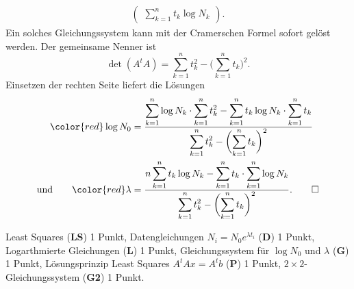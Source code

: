 \begin{loesung}
\begin{align*}
\begin{pmatrix}
\displaystyle \sum_{k=1}^n t_k \log N_k
\end{pmatrix}.
\end{align*}
Ein solches Gleichungssystem kann mit der Cramerschen Formel sofort gelöst
werden.
Der gemeinsame Nenner ist
\[
\det(A^tA)
=
\sum_{k=1}^n t_k^2 - \biggl(\sum_{k=1}^n t_k\biggr)^2.
\]
Einsetzen der rechten Seite liefert die Lösungen
\begin{align*}
{\color{red}\log N_0}
&=
\frac{
\displaystyle
\sum_{k=1}^n \log N_k \cdot \sum_{k=1}^n t_k^2
-
\sum_{k=1}^n t_k\log N_k \cdot \sum_{k=1}^n t_k
}{
\displaystyle
\sum_{k=1}^n t_k^2 - \biggl(\sum_{k=1}^n t_k\biggr)^2}
\\
\text{und}
\qquad
{\color{red}\lambda}
&=
\frac{
\displaystyle
n \sum_{k=1}^n t_k\log N_k
-
\sum_{k=1}^n t_k \cdot \sum_{k=1}^n \log N_k
}{
\displaystyle
\sum_{k=1}^n t_k^2 - \biggl(\sum_{k=1}^n t_k\biggr)^2}.
\qedhere
\end{align*}
\end{loesung}

\begin{bewertung}
Least Squares ({\bf LS}) 1 Punkt,
Datengleichungen $N_i = N_0e^{\lambda t_i}$ ({\bf D}) 1 Punkt,
Logarthmierte Gleichungen ({\bf L}) 1 Punkt,
Gleichungssystem für $\log N_0$ und $\lambda$ ({\bf G}) 1 Punkt,
Lösungsprinzip Least Squares $A^tAx=A^tb$ ({\bf P}) 1 Punkt,
$2\times 2$-Gleichungssystem ({\bf G2}) 1 Punkt.
\end{bewertung}




